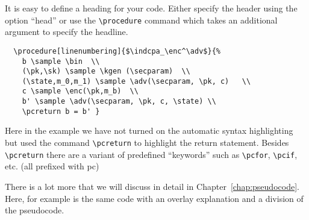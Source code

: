 \documentclass[a4paper]{report}
\begin{document}
  It is easy to define a heading for your code. Either specify the header using the option \enquote{head} or use 
  the \lstinline$\procedure$ command which takes an additional argument to specify the headline.
  \begin{center}
  \end{center}
  
  \begin{lstlisting}
  \procedure[linenumbering]{$\indcpa_\enc^\adv$}{%
	b \sample \bin  \\
	(\pk,\sk) \sample \kgen (\secparam)  \\
	(\state,m_0,m_1) \sample \adv(\secparam, \pk, c)   \\
	c \sample \enc(\pk,m_b)  \\
	b' \sample \adv(\secparam, \pk, c, \state) \\
	\pcreturn b = b' }
  \end{lstlisting}
  Here in the example we have not turned on the automatic syntax highlighting but used the command \lstinline$\pcreturn$
  to highlight the return statement. Besides \lstinline$\pcreturn$ there are a variant of predefined \enquote{keywords}
  such as \lstinline$\pcfor$, \lstinline$\pcif$, etc. (all prefixed with pc)
  
  There is a lot more that we will discuss in detail in Chapter~\ref{chap:pseudocode}. Here, for example
  is the same code with an overlay explanation and a division of the pseudocode.
  \begin{center}
  \end{center}
  
\end{document}
